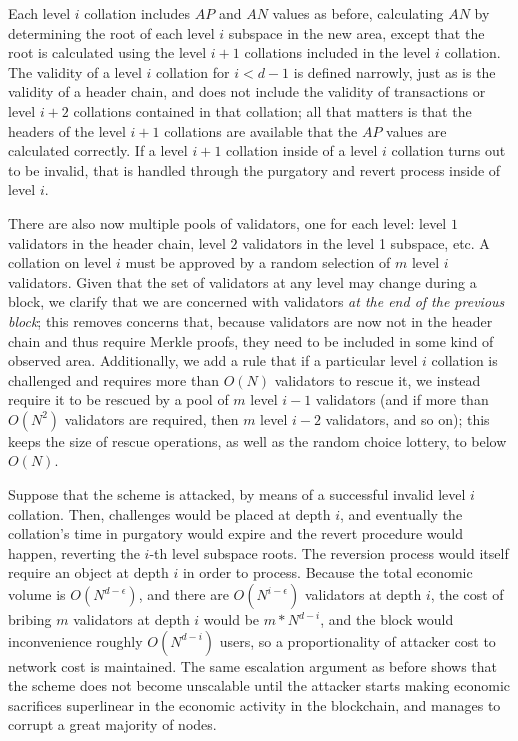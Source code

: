 \documentclass[11pt,a4paper]{article}
\theoremstyle{plain}
\theoremstyle{definition}
\theoremstyle{remark}
\begin{document}
Each level $i$ collation includes $AP$ and $AN$ values as before, calculating $AN$ by determining the root of each level $i$ subspace in the new area, except that the root is calculated using the level $i+1$ collations included in the level $i$ collation. The validity of a level $i$ collation for $i < d-1$ is defined narrowly, just as is the validity of a header chain, and does not include the validity of transactions or level $i+2$ collations contained in that collation; all that matters is that the headers of the level $i+1$ collations are available that the $AP$ values are calculated correctly. If a level $i+1$ collation inside of a level $i$ collation turns out to be invalid, that is handled through the purgatory and revert process inside of level $i$.

There are also now multiple pools of validators, one for each level: level $1$ validators in the header chain, level $2$ validators in the level 1 subspace, etc. A collation on level $i$ must be approved by a random selection of $m$ level $i$ validators. Given that the set of validators at any level may change during a block, we clarify that we are concerned with validators \emph{at the end of the previous block}; this removes concerns that, because validators are now not in the header chain and thus require Merkle proofs, they need to be included in some kind of observed area. Additionally, we add a rule that if a particular level $i$ collation is challenged and requires more than $O(N)$ validators to rescue it, we instead require it to be rescued by a pool of $m$ level $i-1$ validators (and if more than $O(N^2)$ validators are required, then $m$ level $i-2$ validators, and so on); this keeps the size of rescue operations, as well as the random choice lottery, to below $O(N)$. 

Suppose that the scheme is attacked, by means of a successful invalid level $i$ collation. Then, challenges would be placed at depth $i$, and eventually the collation's time in purgatory would expire and the revert procedure would happen, reverting the $i$-th level subspace roots. The reversion process would itself require an object at depth $i$ in order to process. Because the total economic volume is $O(N^{d-\epsilon})$, and there are $O(N^{i-\epsilon})$ validators at depth $i$, the cost of bribing $m$ validators at depth $i$ would be $m * N^{d - i}$, and the block would inconvenience roughly $O(N^{d - i})$ users, so a proportionality of attacker cost to network cost is maintained. The same escalation argument as before shows that the scheme does not become unscalable until the attacker starts making economic sacrifices superlinear in the economic activity in the blockchain, and manages to corrupt a great majority of nodes.
\end{document}
